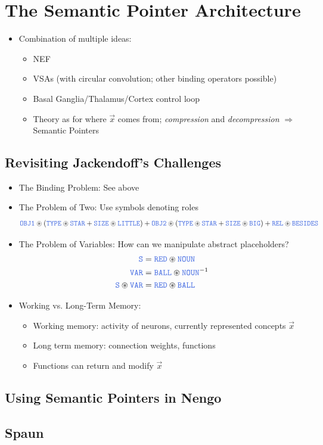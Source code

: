 \documentclass[10pt,letterpaper,oneside]{article}
\begin{document}
\section{The Semantic Pointer Architecture}

\begin{itemize}
	\item Combination of multiple ideas:
	\begin{itemize}
		\item NEF
		\item VSAs (with circular convolution; other binding operators possible)
		\item Basal Ganglia/Thalamus/Cortex control loop
		\item Theory as for where $\vec x$ comes from; \emph{compression} and \emph{decompression} $\Rightarrow$ Semantic Pointers
	\end{itemize}
\end{itemize}


\subsection{Revisiting Jackendoff's Challenges}

\begin{itemize}
	\item The Binding Problem: See above
	\item The Problem of Two: Use symbols denoting roles
	\begin{align*}
	\Obj{OBJ1} \CC (\Obj{TYPE} \CC \Obj{STAR} + \Obj{SIZE} \CC \Obj{LITTLE}) + \Obj{OBJ2} \CC (\Obj{TYPE} \CC \Obj{STAR} + \Obj{SIZE} \CC \Obj{BIG}) + \Obj{REL} \CC \Obj{BESIDES}
	\end{align*}
	\item The Problem of Variables: How can we manipulate abstract placeholders?
	\begin{align*}
	\Obj{S} &= \Obj{RED} \CC \Obj{NOUN} \\
	\Obj{VAR} &= \Obj{BALL} \CC \Obj{NOUN}^{-1} \\
	\Obj{S} \CC \Obj{VAR} &= \Obj{RED} \CC \Obj{BALL}
	\end{align*}
	\item Working vs. Long-Term Memory:
	\begin{itemize}
		\item Working memory: activity of neurons, currently represented concepts $\vec x$
		\item Long term memory: connection weights, functions
		\item Functions can return and modify $\vec x$
	\end{itemize}
\end{itemize}

\subsection{Using Semantic Pointers in Nengo}

\subsection{Spaun}

\printbibliography
\end{document}
